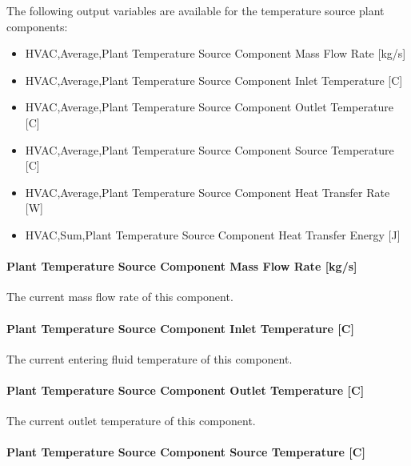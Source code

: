 The following output variables are available for the temperature source plant components:

\begin{itemize}
    \item
    HVAC,Average,Plant Temperature Source Component Mass Flow Rate {[}kg/s{]}
    \item
    HVAC,Average,Plant Temperature Source Component Inlet Temperature {[}C{]}
    \item
    HVAC,Average,Plant Temperature Source Component Outlet Temperature {[}C{]}
    \item
    HVAC,Average,Plant Temperature Source Component Source Temperature {[}C{]}
    \item
    HVAC,Average,Plant Temperature Source Component Heat Transfer Rate {[}W{]}
    \item
    HVAC,Sum,Plant Temperature Source Component Heat Transfer Energy {[}J{]}
\end{itemize}

\paragraph{Plant Temperature Source Component Mass Flow Rate {[}kg/s{]}}\label{plant-temperature-source-component-mass-flow-rate-kgs}

The current mass flow rate of this component.

\paragraph{Plant Temperature Source Component Inlet Temperature {[}C{]}}\label{plant-temperature-source-component-inlet-temperature-c}

The current entering fluid temperature of this component.

\paragraph{Plant Temperature Source Component Outlet Temperature {[}C{]}}\label{plant-temperature-source-component-outlet-temperature-c}

The current outlet temperature of this component.

\paragraph{Plant Temperature Source Component Source Temperature {[}C{]}}\label{plant-temperature-source-component-source-temperature-c}

